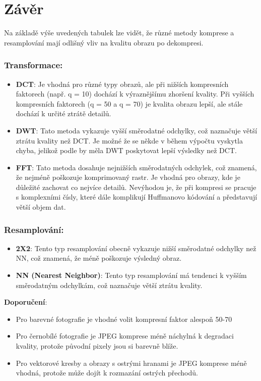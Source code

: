 \newpage
\section*{Závěr}

Na základě výše uvedených tabulek lze vidět, že různé metody komprese a resamplování mají odlišný vliv na kvalitu obrazu po dekompresi.

\subsubsection*{Transformace:}
\begin{itemize}
    \item \textbf{DCT}: Je vhodná pro různé typy obrazů, ale při nižších kompresních faktorech (např. q = 10) dochází k výraznějšímu zhoršení kvality. Při vyšších kompresních faktorech (q = 50 a q = 70) je kvalita obrazu lepší, ale stále dochází k určité ztrátě detailů.
    \item \textbf{DWT}: Tato metoda vykazuje vyšší směrodatné odchylky, což naznačuje větší ztrátu kvality než DCT. Je možné že se někde v během výpočtu vyskytla chyba, jelikož podle \cite{JPEG2000Wiki} by měla DWT poskytovat lepší výsledky než DCT.
    \item \textbf{FFT}: Tato metoda dosahuje nejnižších směrodatných odchylek, což znamená, že nejméně poškozuje komprimovaný rastr. Je vhodná pro obrazy, kde je důležité zachovat co nejvíce detailů. Nevýhodou je, že při kompresi se pracuje s komplexními čísly, které dále komplikují Huffmanovo kódování a představují větší objem dat.
\end{itemize}

\subsubsection*{Resamplování:}
\begin{itemize}
    \item \textbf{2X2}: Tento typ resamplování obecně vykazuje nižší směrodatné odchylky než NN, což znamená, že méně poškozuje výsledný obraz.
    \item \textbf{NN (Nearest Neighbor)}: Tento typ resamplování má tendenci k vyšším směrodatným odchylkám, což naznačuje větší ztrátu kvality.
\end{itemize}

\textbf{Doporučení}:
\begin{itemize}
    \item Pro barevné fotografie je vhodné volit kompresní faktor alespoň 50-70%
    \item Pro černobílé fotografie je JPEG komprese méně náchylná k degradaci kvality, protože původní pixely jsou si barevně blíže.
    \item Pro vektorové kresby a obrazy s ostrými hranami je JPEG komprese méně vhodná, protože může dojít k rozmazání ostrých přechodů.
\end{itemize}


